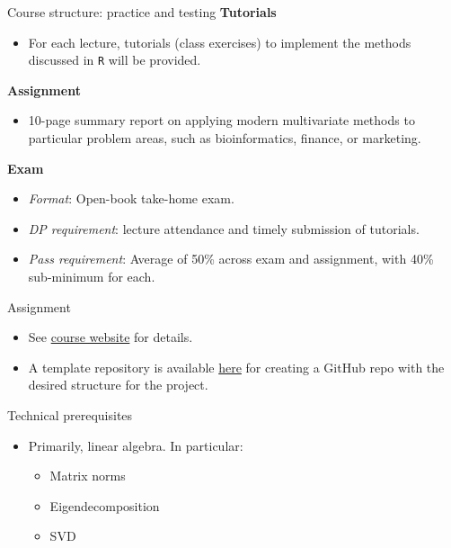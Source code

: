 \documentclass[
  ignorenonframetext,
  aspectratio=169,
]{beamer}
\providecommand{\tightlist}{%
  \setlength{\itemsep}{0pt}\setlength{\parskip}{0pt}}\usepackage{longtable,booktabs,array}
\begin{document}
\begin{frame}[fragile]{Course structure: practice and testing}
\protect\hypertarget{course-structure-practice-and-testing}{}
\textbf{Tutorials}

\begin{itemize}
\tightlist
\item
  For each lecture, tutorials (class exercises) to implement the methods
  discussed in \texttt{R} will be provided.
\end{itemize}

\textbf{Assignment}

\begin{itemize}
\tightlist
\item
  10-page summary report on applying modern multivariate methods to
  particular problem areas, such as bioinformatics, finance, or
  marketing.
\end{itemize}

\textbf{Exam}

\begin{itemize}
\tightlist
\item
  \emph{Format}: Open-book take-home exam.
\item
  \emph{DP requirement}: lecture attendance and timely submission of
  tutorials.
\item
  \emph{Pass requirement}: Average of 50\% across exam and assignment,
  with 40\% sub-minimum for each.
\end{itemize}
\end{frame}

\begin{frame}{Assignment}
\protect\hypertarget{assignment}{}
\begin{itemize}
\tightlist
\item
  See
  \href{https://sebnemer.github.io/english/courses/multivariate/assignment-description.html}{course
  website} for details.
\item
  A template repository is available
  \href{https://github.com/MiguelRodo/Template24STA5069Z}{here} for
  creating a GitHub repo with the desired structure for the project.
\end{itemize}
\end{frame}

\begin{frame}{Technical prerequisites}
\protect\hypertarget{technical-prerequisites}{}
\begin{itemize}
\tightlist
\item
  Primarily, linear algebra. In particular:

  \begin{itemize}
  \tightlist
  \item
    Matrix norms
  \item
    Eigendecomposition
  \item
    SVD
  \end{itemize}
\end{itemize}
\end{frame}
\end{document}
